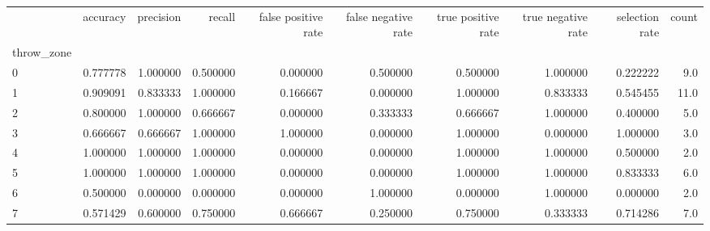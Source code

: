 \begin{tabular}{lrrrrrrrrr}
\toprule
{} &  accuracy &  precision &    recall &  false positive rate &  false negative rate &  true positive rate &  true negative rate &  selection rate &  count \\
throw\_zone &           &            &           &                      &                      &                     &                     &                 &        \\
\midrule
0          &  0.777778 &   1.000000 &  0.500000 &             0.000000 &             0.500000 &            0.500000 &            1.000000 &        0.222222 &    9.0 \\
1          &  0.909091 &   0.833333 &  1.000000 &             0.166667 &             0.000000 &            1.000000 &            0.833333 &        0.545455 &   11.0 \\
2          &  0.800000 &   1.000000 &  0.666667 &             0.000000 &             0.333333 &            0.666667 &            1.000000 &        0.400000 &    5.0 \\
3          &  0.666667 &   0.666667 &  1.000000 &             1.000000 &             0.000000 &            1.000000 &            0.000000 &        1.000000 &    3.0 \\
4          &  1.000000 &   1.000000 &  1.000000 &             0.000000 &             0.000000 &            1.000000 &            1.000000 &        0.500000 &    2.0 \\
5          &  1.000000 &   1.000000 &  1.000000 &             0.000000 &             0.000000 &            1.000000 &            1.000000 &        0.833333 &    6.0 \\
6          &  0.500000 &   0.000000 &  0.000000 &             0.000000 &             1.000000 &            0.000000 &            1.000000 &        0.000000 &    2.0 \\
7          &  0.571429 &   0.600000 &  0.750000 &             0.666667 &             0.250000 &            0.750000 &            0.333333 &        0.714286 &    7.0 \\
\bottomrule
\end{tabular}
